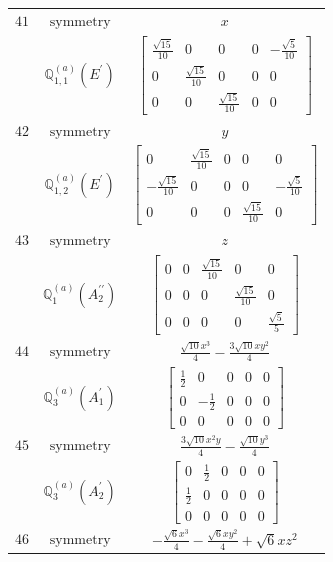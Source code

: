 \documentclass[fleqn,8pt,landscape]{jsarticle}
\begin{document}
\begin{longtable}{ccc}
$ 41 $ & $ \text{symmetry} $ & $ x $ \\
$  $ & $ \mathbb{Q}_{1,1}^{(a)}(E^{\prime}) $ & $ \begin{bmatrix} \frac{\sqrt{15}}{10} & 0 & 0 & 0 & - \frac{\sqrt{5}}{10} \\ 0 & \frac{\sqrt{15}}{10} & 0 & 0 & 0 \\ 0 & 0 & \frac{\sqrt{15}}{10} & 0 & 0 \end{bmatrix} $ \\ \hline
$ 42 $ & $ \text{symmetry} $ & $ y $ \\
$  $ & $ \mathbb{Q}_{1,2}^{(a)}(E^{\prime}) $ & $ \begin{bmatrix} 0 & \frac{\sqrt{15}}{10} & 0 & 0 & 0 \\ - \frac{\sqrt{15}}{10} & 0 & 0 & 0 & - \frac{\sqrt{5}}{10} \\ 0 & 0 & 0 & \frac{\sqrt{15}}{10} & 0 \end{bmatrix} $ \\ \hline
$ 43 $ & $ \text{symmetry} $ & $ z $ \\
$  $ & $ \mathbb{Q}_{1}^{(a)}(A_{2}^{\prime\prime}) $ & $ \begin{bmatrix} 0 & 0 & \frac{\sqrt{15}}{10} & 0 & 0 \\ 0 & 0 & 0 & \frac{\sqrt{15}}{10} & 0 \\ 0 & 0 & 0 & 0 & \frac{\sqrt{5}}{5} \end{bmatrix} $ \\ \hline
$ 44 $ & $ \text{symmetry} $ & $ \frac{\sqrt{10} x^{3}}{4} - \frac{3 \sqrt{10} x y^{2}}{4} $ \\
$  $ & $ \mathbb{Q}_{3}^{(a)}(A_{1}^{\prime}) $ & $ \begin{bmatrix} \frac{1}{2} & 0 & 0 & 0 & 0 \\ 0 & - \frac{1}{2} & 0 & 0 & 0 \\ 0 & 0 & 0 & 0 & 0 \end{bmatrix} $ \\ \hline
$ 45 $ & $ \text{symmetry} $ & $ \frac{3 \sqrt{10} x^{2} y}{4} - \frac{\sqrt{10} y^{3}}{4} $ \\
$  $ & $ \mathbb{Q}_{3}^{(a)}(A_{2}^{\prime}) $ & $ \begin{bmatrix} 0 & \frac{1}{2} & 0 & 0 & 0 \\ \frac{1}{2} & 0 & 0 & 0 & 0 \\ 0 & 0 & 0 & 0 & 0 \end{bmatrix} $ \\ \hline
$ 46 $ & $ \text{symmetry} $ & $ - \frac{\sqrt{6} x^{3}}{4} - \frac{\sqrt{6} x y^{2}}{4} + \sqrt{6} x z^{2} $ \\

\end{longtable}
\end{document}
